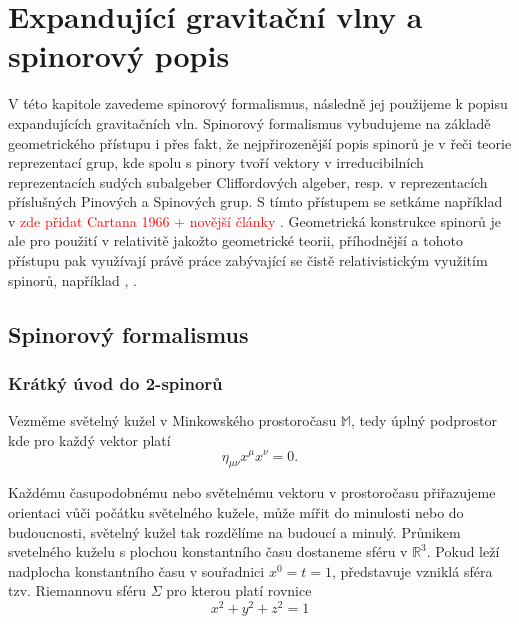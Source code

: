 \newcommand{\Ab}{{\boldsymbol{A}}}
\newcommand{\Bb}{{\boldsymbol{B}}}
\newcommand{\Cb}{{\boldsymbol{C}}}
\newcommand{\Db}{{\boldsymbol{D}}}

\chapter{Expandující gravitační vlny a spinorový popis}
V této kapitole zavedeme spinorový formalismus, následně jej použijeme k popisu expandujících
gravitačních vln. Spinorový formalismus vybudujeme na základě geometrického přístupu i přes fakt, že
nejpřirozenější popis spinorů je v řeči teorie reprezentací grup, kde spolu s pinory tvoří vektory v
irreducibilních reprezentacích sudých subalgeber Cliffordových algeber, resp. v reprezentacích příslušných
Pinových a Spinových grup. S tímto přístupem se setkáme například v \textcolor{red}{zde přidat Cartana 1966
+ novější články}
\cite{fecko_2006}. Geometrická konstrukce spinorů je ale pro použití v relativitě jakožto geometrické teorii,
příhodnější a tohoto přístupu pak využívají právě práce zabývající se čistě relativistickým využitím spinorů, například
\cite{penrose_rindler_1984}, \cite{doi:10.1142/5222}.
\section{Spinorový formalismus}
\subsection{Krátký úvod do 2-spinorů}

Vezměme světelný kužel v Minkowského prostoročasu $\mathbb{M}$, tedy úplný podprostor kde pro každý vektor platí
\begin{equation}
    \eta_{\mu \nu} x^\mu x^\nu = 0.
\end{equation}

Každému časupodobnému nebo světelnému vektoru v prostoročasu přiřazujeme orientaci vůči počátku světelného
kužele, může mířit do minulosti nebo do budoucnosti, světelný kužel tak rozdělíme na budoucí a minulý.
Průnikem svetelného kuželu s plochou konstantního času dostaneme sféru v $\mathbb{R}^3$. Pokud leží nadplocha
konstantního času v souřadnici $x^0 = t =1$, představuje vzniklá sféra tzv. Riemannovu sféru $\Sigma$ pro kterou
platí rovnice
\begin{equation}
    x^2 + y^2 + z^2 = 1
\end{equation} 

